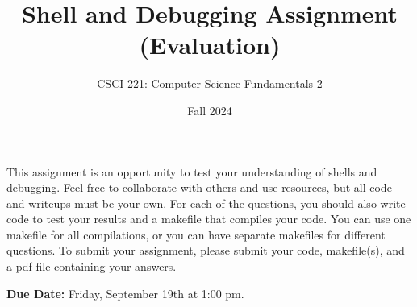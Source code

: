 \documentclass{exam}
\begin{document}
\title{Shell and Debugging Assignment (Evaluation)}
\author{CSCI 221: Computer Science Fundamentals 2}
\date{Fall 2024}
\maketitle


This assignment is an opportunity to test your understanding of shells and debugging. 
Feel free to collaborate with others and use resources, but all code and writeups must be your own. 
For each of the questions, you should also write code to test your results and a makefile that compiles your code. 
You can use one makefile for all compilations, or you can have separate makefiles for different questions. 
To submit your assignment, please submit your code, makefile(s), and a pdf file containing your answers. 

\textbf{Due Date:}
Friday, September 19th at 1:00 pm. 
\end{document}

